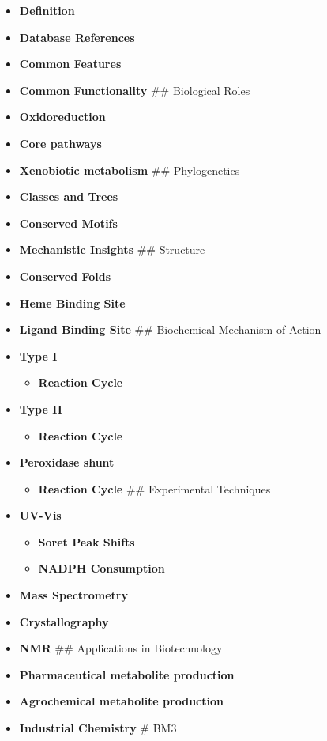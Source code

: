 \begin{itemize}
\tightlist
\item
  \textbf{Definition}
\item
  \textbf{Database References}
\item
  \textbf{Common Features}
\item
  \textbf{Common Functionality} \#\# Biological Roles
\item
  \textbf{Oxidoreduction}
\item
  \textbf{Core pathways}
\item
  \textbf{Xenobiotic metabolism} \#\# Phylogenetics
\item
  \textbf{Classes and Trees}
\item
  \textbf{Conserved Motifs}
\item
  \textbf{Mechanistic Insights} \#\# Structure
\item
  \textbf{Conserved Folds}
\item
  \textbf{Heme Binding Site}
\item
  \textbf{Ligand Binding Site} \#\# Biochemical Mechanism of Action
\item
  \textbf{Type I}

  \begin{itemize}
  \tightlist
  \item
    \textbf{Reaction Cycle}
  \end{itemize}
\item
  \textbf{Type II}

  \begin{itemize}
  \tightlist
  \item
    \textbf{Reaction Cycle}
  \end{itemize}
\item
  \textbf{Peroxidase shunt}

  \begin{itemize}
  \tightlist
  \item
    \textbf{Reaction Cycle} \#\# Experimental Techniques
  \end{itemize}
\item
  \textbf{UV-Vis}

  \begin{itemize}
  \tightlist
  \item
    \textbf{Soret Peak Shifts}
  \item
    \textbf{NADPH Consumption}
  \end{itemize}
\item
  \textbf{Mass Spectrometry}
\item
  \textbf{Crystallography}
\item
  \textbf{NMR} \#\# Applications in Biotechnology
\item
  \textbf{Pharmaceutical metabolite production}
\item
  \textbf{Agrochemical metabolite production}
\item
  \textbf{Industrial Chemistry} \# BM3
\end{itemize}

